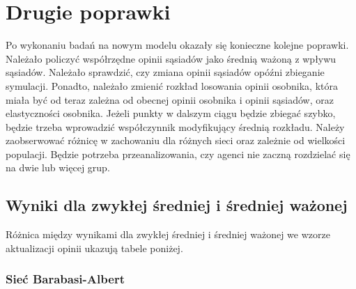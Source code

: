 \documentclass{wfiisul}
\begin{document}
\section{Drugie poprawki}

Po wykonaniu badań na nowym modelu okazały się konieczne kolejne poprawki.
Należało policzyć współrzędne opinii sąsiadów jako średnią ważoną z wpływu sąsiadów.
Należało sprawdzić, czy zmiana opinii sąsiadów opóźni zbieganie symulacji.
Ponadto, należało zmienić rozkład losowania opinii osobnika, która miała być od teraz zależna od obecnej opinii osobnika i opinii sąsiadów, oraz elastyczności osobnika.
Jeżeli punkty w dalszym ciągu będzie zbiegać szybko, będzie trzeba wprowadzić współczynnik modyfikujący średnią rozkładu.
Należy zaobserwować różnicę w zachowaniu dla różnych sieci oraz zależnie od wielkości populacji.
Będzie potrzeba przeanalizowania, czy agenci nie zaczną rozdzielać się na dwie lub więcej grup.

\subsection{Wyniki dla zwykłej średniej i średniej ważonej}

Różnica między wynikami dla zwykłej średniej i średniej ważonej we wzorze aktualizacji opinii ukazują tabele poniżej.

\subsubsection{Sieć Barabasi-Albert}
\end{document}
